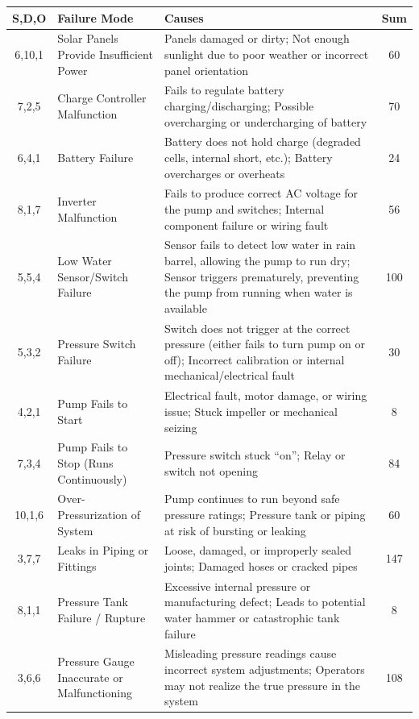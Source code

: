 \documentclass[12pt]{article}
\begin{document}
\begin{itemize}
\begin{longtable}{|c|p{4cm}|p{8cm}|c|}
\hline
\textbf{S,D,O} & \textbf{Failure Mode} & \textbf{Causes} & \textbf{Sum} \\
\hline
6,10,1 & Solar Panels Provide Insufficient Power & Panels damaged or dirty; Not enough sunlight due to poor weather or incorrect panel orientation & 60 \\
\hline
7,2,5 & Charge Controller Malfunction & Fails to regulate battery charging/discharging; Possible overcharging or undercharging of battery & 70 \\
\hline
6,4,1 & Battery Failure & Battery does not hold charge (degraded cells, internal short, etc.); Battery overcharges or overheats & 24 \\
\hline
8,1,7 & Inverter Malfunction & Fails to produce correct AC voltage for the pump and switches; Internal component failure or wiring fault & 56 \\
\hline
5,5,4 & Low Water Sensor/Switch Failure & Sensor fails to detect low water in rain barrel, allowing the pump to run dry; Sensor triggers prematurely, preventing the pump from running when water is available & 100 \\
\hline
5,3,2 & Pressure Switch Failure & Switch does not trigger at the correct pressure (either fails to turn pump on or off); Incorrect calibration or internal mechanical/electrical fault & 30 \\
\hline
4,2,1 & Pump Fails to Start & Electrical fault, motor damage, or wiring issue; Stuck impeller or mechanical seizing & 8 \\
\hline
7,3,4 & Pump Fails to Stop (Runs Continuously) & Pressure switch stuck “on”; Relay or switch not opening & 84 \\
\hline
10,1,6 & Over-Pressurization of System & Pump continues to run beyond safe pressure ratings; Pressure tank or piping at risk of bursting or leaking & 60 \\
\hline
3,7,7 & Leaks in Piping or Fittings & Loose, damaged, or improperly sealed joints; Damaged hoses or cracked pipes & 147 \\
\hline
8,1,1 & Pressure Tank Failure / Rupture & Excessive internal pressure or manufacturing defect; Leads to potential water hammer or catastrophic tank failure & 8 \\
\hline
3,6,6 & Pressure Gauge Inaccurate or Malfunctioning & Misleading pressure readings cause incorrect system adjustments; Operators may not realize the true pressure in the system & 108 \\

\end{longtable}
\end{itemize}
\end{document}
